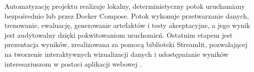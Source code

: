 Automatyzację projektu realizuje lokalny, deterministyczny potok uruchamiany bezpośrednio lub przez Docker Compose. Potok wykonuje przetwarzanie danych, trenowanie, ewaluację, generowanie artefaktów i testy akceptacyjne, a jego wynik jest audytowalny dzięki pokwitowaniom uruchomień. Ostatnim etapem jest prezentacja wyników, zrealizowana za pomocą biblioteki Streamlit, pozwalającej na tworzenie interaktywnych wizualizacji danych i udostępnianie wyników interesariuszom w postaci aplikacji webowej \cite{Streamlit2023}.